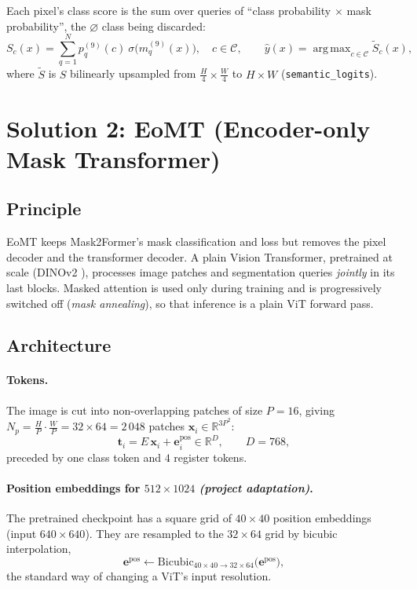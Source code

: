 \documentclass[11pt,a4paper]{article}
\newcommand{\R}{\mathbb{R}}
\newcommand{\1}{\mathbb{1}}
\newcommand{\sg}{\sigma}
\newcommand{\nulc}{\varnothing}
\DeclareMathOperator*{\argmax}{arg\,max}
\begin{document}
Each pixel's class score is the sum over queries of ``class probability
$\times$ mask probability'', the $\nulc$ class being discarded:
\[
S_c(x) = \sum_{q=1}^{N} p^{(9)}_q(c)\ \sg\big(m^{(9)}_q(x)\big),\quad c\in\mathcal{C},
\qquad
\hat y(x) = \argmax_{c\in\mathcal{C}} \tilde S_c(x),
\]
where $\tilde S$ is $S$ bilinearly upsampled from $\frac H4\times\frac W4$ to
$H\times W$ (\texttt{semantic\_logits}).

\section{Solution 2: EoMT (Encoder-only Mask Transformer)}\label{sec:eomt}

\subsection{Principle}

EoMT \cite{kerssies2025vitsecretlyimagesegmentation} keeps Mask2Former's mask classification and loss but
removes the pixel decoder and the transformer decoder. A plain Vision
Transformer, pretrained at scale (DINOv2 \cite{oquab2023}), processes image
patches and segmentation queries \emph{jointly} in its last blocks. Masked
attention is used only during training and is progressively switched off
(\emph{mask annealing}), so that inference is a plain ViT forward pass.

\subsection{Architecture}

\paragraph{Tokens.} The image is cut into non-overlapping patches of size
$P=16$, giving $N_p = \frac HP\cdot\frac WP = 32\times64 = 2\,048$ patches
$\bm x_i\in\R^{3P^2}$:
\[
\bm t_i = E\,\bm x_i + \bm e^{\text{pos}}_i \in \R^{D},\qquad D=768,
\]
preceded by one class token and $4$ register tokens.

\paragraph{Position embeddings for $512\times1024$ \emph{(project adaptation)}.}
The pretrained checkpoint has a square grid of $40\times40$ position
embeddings (input $640\times640$). They are resampled to the $32\times64$
grid by bicubic interpolation,
\[
\bm e^{\text{pos}} \leftarrow \mathrm{Bicubic}_{40\times40\to32\times64}\big(\bm e^{\text{pos}}\big),
\]
the standard way of changing a ViT's input resolution.
\end{document}
